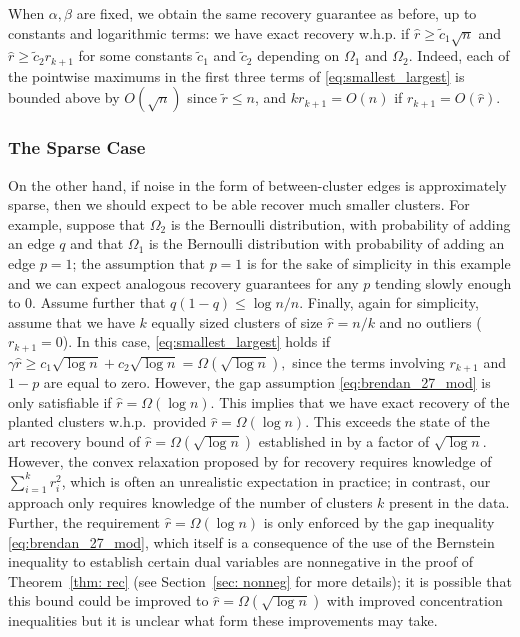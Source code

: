 \documentclass[twoside,11pt]{article}
\newcommand{\0}{\bs{0}}
\newcommand{\ra}{\rightarrow}
\begin{document}
{When \( \alpha, \beta \) are fixed, we obtain the same recovery guarantee as before, up to constants and logarithmic
terms:  we have exact recovery w.h.p.
if \(\hat r \ge \tilde c_1 \sqrt{n} \) and \(\hat r \ge \tilde c_2 r_{k+1} \)
for some constants \(\tilde c_1\) and \(\tilde c_2\) depending on \(\Omega_1\) and \(\Omega_2\).
Indeed, each of the pointwise maximums in the first  three terms
of \eqref{eq:smallest_largest} is bounded above by $O(\sqrt{n})$
since $\tilde r \le n$, and $k r_{k+1} = O(n)$ if $r_{k+1} = O(\hat r)$.

\subsubsection{The Sparse Case}


On the other hand, if noise in the form of between-cluster
edges is  approximately sparse, then we
should expect to be able recover
much smaller clusters.
For example, suppose that \(\Omega_2\) is the Bernoulli distribution, with probability of adding an edge \(q\) and that \(\Omega_1\) is the Bernoulli distribution with probability of adding an edge \(p=1\); the assumption that \(p=1\) is for the sake of simplicity in this example and we can expect analogous recovery guarantees for
any \(p\) tending slowly enough to \(0\).
Assume further that
\(
q (1-q)  \le {\log n }/{n}.
\)
Finally, again for simplicity, assume that we have \(k\) equally sized clusters of size \(\hat r = n/k\)
and no outliers (\(r_{k+1} = 0\)).
In this case, \eqref{eq:smallest_largest}
holds if
$
\gamma \hat r \ge c_1 \sqrt{\log n} + c_2 \sqrt{\log n}
= \Omega(\sqrt{\log n} ),
$
since the terms involving \(r_{k+1}\) and \(1-p\) are equal to zero.
However, the gap assumption \eqref{eq:brendan_27_mod} is only
satisfiable if $\hat r = \Omega(\log n)$.
This implies that we have exact recovery of the planted clusters
w.h.p.~provided $\hat r =\Omega(\log n)$. This exceeds the
state of the art recovery bound
of $\hat r = \Omega(\sqrt{\log n})$ established in \cite{jalali2015relative}
by a factor of $\sqrt{\log n}$.
However, the convex relaxation proposed by
\cite{jalali2015relative} for recovery requires knowledge
of $\sum_{i=1}^k r_i^2$, which is often an unrealistic
expectation in practice;
in contrast, our approach only requires knowledge
of the number of clusters $k$ present in the data.
Further,  the requirement $\hat r = \Omega(\log n)$
is only enforced by the gap inequality \eqref{eq:brendan_27_mod},
which itself is a consequence of the use of the Bernstein inequality
to establish certain dual variables are nonnegative
in the proof of Theorem~\ref{thm: rec} (see Section~\ref{sec: nonneg}
for more details); it is possible that this bound could be improved
to $\hat r = \Omega(\sqrt{\log n})$ with improved concentration
inequalities
 but it is unclear
what form these improvements may take.


}
\end{document}
